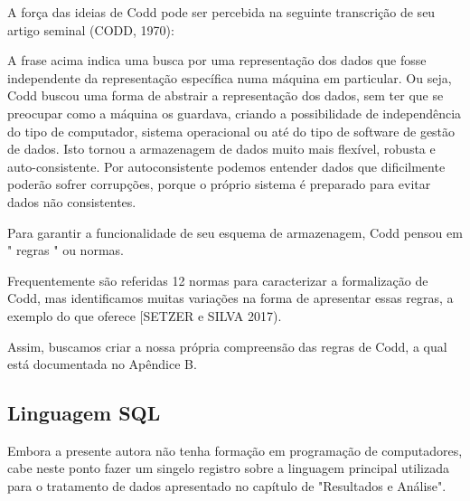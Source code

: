 A força das ideias de Codd pode ser percebida na seguinte transcrição de seu artigo seminal (CODD, 1970):


\noindent\begin{center}\mbox{\centering{}}\end{center}


A frase acima indica uma busca por uma representação dos dados que fosse independente da representação específica numa máquina em particular. Ou seja, Codd buscou uma forma de abstrair a representação dos dados, sem ter que se preocupar como a máquina os guardava, criando a possibilidade de independência do tipo de computador, sistema operacional ou até do tipo de software de gestão de dados. Isto tornou a armazenagem de dados muito mais flexível, robusta e auto-consistente. Por autoconsistente podemos entender dados que dificilmente poderão sofrer corrupções, porque o próprio sistema é preparado para evitar dados não consistentes.

Para garantir a funcionalidade de seu esquema de armazenagem, Codd pensou em " regras " ou normas.

Frequentemente são referidas 12 normas para caracterizar a formalização de Codd, mas identificamos muitas variações na forma de apresentar essas regras, a exemplo do que oferece [SETZER e SILVA 2017).

Assim, buscamos criar a nossa própria compreensão das regras de Codd, a qual está documentada no Apêndice B.

\subsection[Linguagem SQL]{Linguagem SQL}\label{Linguagem SQL}
Embora a presente autora não tenha formação em programação de computadores, cabe neste ponto fazer um singelo registro sobre a linguagem principal utilizada para o tratamento de dados apresentado no capítulo de "Resultados e Análise".

